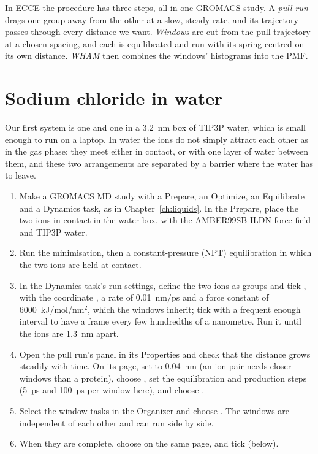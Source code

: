 In ECCE the procedure has three steps, all in one GROMACS study. A \emph{pull run} drags one group away from the other at a slow, steady rate, and its trajectory passes through every distance we want. \emph{Windows} are cut from the pull trajectory at a chosen spacing, and each is equilibrated and run with its spring centred on its own distance. \emph{WHAM} then combines the windows' histograms into the PMF.

\section{Sodium chloride in water}
Our first system is one  and one  in a 3.2~nm box of TIP3P water, which is small enough to run on a laptop. In water the ions do not simply attract each other as in the gas phase: they meet either in contact, or with one layer of water between them, and these two arrangements are separated by a barrier where the water has to leave.
\begin{enumerate}
	\item Make a GROMACS MD study with a Prepare, an Optimize, an Equilibrate and a Dynamics task, as in Chapter~\ref{ch:liquids}. In the Prepare, place the two ions in contact in the water box, with the AMBER99SB-ILDN force field and TIP3P water.
	\item Run the minimisation, then a constant-pressure (NPT) equilibration in which the two ions are held at contact.
	\item In the Dynamics task's run settings, define the two ions as groups and tick , with the coordinate , a rate of 0.01~nm/ps and a force constant of 6000~kJ/mol/nm$^2$, which the windows inherit; tick  with a frequent enough interval to have a frame every few hundredths of a nanometre. Run it until the ions are 1.3~nm apart.
	\item Open the pull run's  panel in its Properties and check that the distance grows steadily with time. On its  page, set  to 0.04~nm (an ion pair needs closer windows than a protein), choose , set the equilibration and production steps (5~ps and 100~ps per window here), and choose .
	\item Select the window tasks in the Organizer and choose . The windows are independent of each other and can run side by side.
	\item When they are complete, choose  on the same page, and tick  (below).
\end{enumerate}

